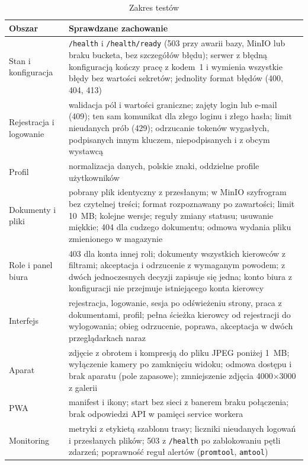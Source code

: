 \begin{table}[htbp]
\centering
\caption{Zakres testów}
\label{tab:zakres-testow}
\small
\begin{tabular}{|p{}|p{}|}
\hline
\textbf{Obszar} & \textbf{Sprawdzane zachowanie} \\
\hline
Stan i konfiguracja & \texttt{/health} i \texttt{/health/ready} (503 przy awarii bazy, MinIO lub braku bucketa, bez szczegółów błędu); serwer z błędną konfiguracją kończy pracę z kodem~1 i wymienia wszystkie błędy bez wartości sekretów; jednolity format błędów (400, 404, 413) \\
\hline
Rejestracja i logowanie & walidacja pól i wartości graniczne; zajęty login lub e-mail (409); ten sam komunikat dla złego loginu i złego hasła; limit nieudanych prób (429); odrzucanie tokenów wygasłych, podpisanych innym kluczem, niepodpisanych i z obcym wystawcą \\
\hline
Profil & normalizacja danych, polskie znaki, oddzielne profile użytkowników \\
\hline
Dokumenty i pliki & pobrany plik identyczny z przesłanym; w MinIO szyfrogram bez czytelnej treści; format rozpoznawany po zawartości; limit 10~MB; kolejne wersje; reguły zmiany statusu; usuwanie miękkie; 404 dla cudzego dokumentu; odmowa wydania pliku zmienionego w magazynie \\
\hline
Role i panel biura & 403 dla konta innej roli; dokumenty wszystkich kierowców z filtrami; akceptacja i odrzucenie z wymaganym powodem; z dwóch jednoczesnych decyzji zapisuje się jedna; konto biura z konfiguracji nie przejmuje istniejącego konta kierowcy \\
\hline
Interfejs & rejestracja, logowanie, sesja po odświeżeniu strony, praca z dokumentami, profil; pełna ścieżka kierowcy od rejestracji do wylogowania; obieg odrzucenie, poprawa, akceptacja w dwóch przeglądarkach naraz \\
\hline
Aparat & zdjęcie z obrotem i kompresją do pliku JPEG poniżej 1~MB; wyłączenie kamery po zamknięciu widoku; odmowa dostępu i brak aparatu (pole zapasowe); zmniejszenie zdjęcia 4000$\times$3000 z galerii \\
\hline
PWA & manifest i ikony; start bez sieci z banerem braku połączenia; brak odpowiedzi API w pamięci service workera \\
\hline
Monitoring & metryki z etykietą szablonu trasy; liczniki nieudanych logowań i przesłanych plików; 503 z \texttt{/health} po zablokowaniu pętli zdarzeń; poprawność reguł alertów (\texttt{promtool}, \texttt{amtool}) \\
\hline
\end{tabular}
\par
{}
\end{table}

